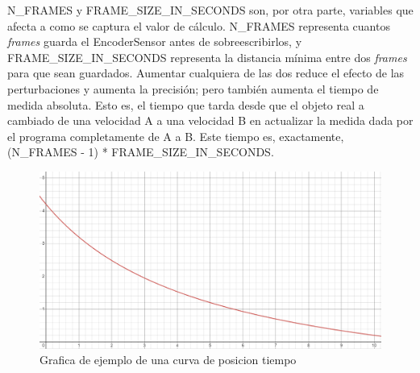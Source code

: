 \documentclass{report}
\begin{document}
N\_FRAMES y FRAME\_SIZE\_IN\_SECONDS son, por otra parte, variables que afecta a como se captura el valor de cálculo. N\_FRAMES representa cuantos \textit{frames} guarda el EncoderSensor antes de sobreescribirlos, y FRAME\_SIZE\_IN\_SECONDS representa la distancia mínima entre dos \textit{frames} para que sean guardados. Aumentar cualquiera de las dos reduce el efecto de las perturbaciones y aumenta la precisión; pero también aumenta el tiempo de medida absoluta. Esto es, el tiempo que tarda desde que el objeto real a cambiado de una velocidad A a una velocidad B en actualizar la medida dada por el programa completamente de A a B. Este tiempo es, exactamente, (N\_FRAMES - 1) * FRAME\_SIZE\_IN\_SECONDS. 

\begin{figure}[H]
  \centering
  \includegraphics[scale=0.45]{Imagenes/grafica_ejemplo.PNG}
  \caption{Grafica de ejemplo de una curva de posicion  tiempo}
  \label{PosTimeGraphic}
\end{figure}
\end{document}
